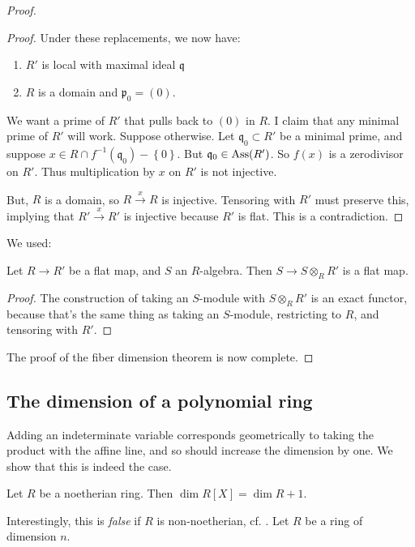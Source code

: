 \begin{proof}
\begin{proof}
Under these replacements, we now have:
\begin{enumerate}
\item $R'$ is local with maximal ideal $\mathfrak{q}$ 
\item $R$ is a domain and $\mathfrak{p}_0 = (0)$.
\end{enumerate}
We want a prime of $R'$ that pulls back to $(0)$ in $R$. I claim that any
minimal prime of $R'$ will work. 
Suppose otherwise. Let $\mathfrak{q}_0 \subset R'$ be a minimal prime, and
suppose $x \in R \cap f^{-1}(\mathfrak{q}_0) - \left\{0\right\}$. But
$\mathfrak{q}_0 \in \operatorname{Ass}(R')$. So $f(x)$ is
a zerodivisor on $R'$. Thus multiplication by $x$ on $R'$ is not injective. 

But, $R$ is a domain, so $R \stackrel{x}{\to} R$ is injective. Tensoring with
$R'$ must preserve this, implying that $R' \stackrel{x}{\to} R'$ is injective
because $R'$ is flat. This is a contradiction.
\end{proof} 

We used:
\begin{lemma} 
Let $R \to R'$ be a flat map, and $S$ an $R$-algebra. Then $S \to S \otimes_R
R'$ is a flat map.
\end{lemma} 
\begin{proof} 
The construction of taking an $S$-module with $S \otimes_R R'$ is an exact
functor, because that's the same thing as taking an $S$-module, restricting to
$R$, and tensoring with $R'$.
\end{proof} 
The proof of the fiber dimension theorem is now complete.

\end{proof} 



\subsection{The dimension of a polynomial ring}

Adding an indeterminate variable corresponds geometrically to taking the
product with the affine line, and so should increase the dimension by one. We
show that this is indeed the case.
\label{dimpoly}
\begin{theorem} 
Let $R$ be a noetherian ring. Then $\dim R[X] = \dim R+1$.
\end{theorem} 

Interestingly, this is \emph{false} if $R$ is non-noetherian, cf. \cite{}.
Let $R$ be a ring of dimension $n$. 

